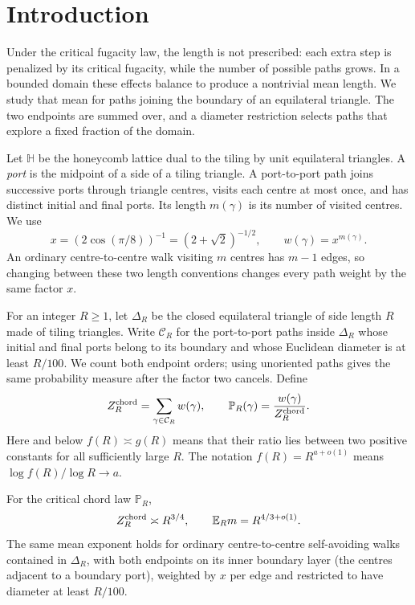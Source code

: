 \section{Introduction}
\label{sec:introduction}

Under the critical fugacity law, the length is not prescribed: each extra step is penalized by its critical fugacity, while the number of possible paths grows. In a bounded domain these effects balance to produce a nontrivial mean length. We study that mean for paths joining the boundary of an equilateral triangle. The two endpoints are summed over, and a diameter restriction selects paths that explore a fixed fraction of the domain.

Let $\mathbb H$ be the honeycomb lattice dual to the tiling by unit equilateral triangles. A \emph{port} is the midpoint of a side of a tiling triangle. A port-to-port path joins successive ports through triangle centres, visits each centre at most once, and has distinct initial and final ports. Its length $m(\gamma)$ is its number of visited centres. We use
\[
 x=(2\cos(\pi/8))^{-1}=(2+\sqrt2)^{-1/2},
 \qquad w(\gamma)=x^{m(\gamma)}.
\]
An ordinary centre-to-centre walk visiting $m$ centres has $m-1$ edges, so changing between these two length conventions changes every path weight by the same factor $x$.

For an integer $R\ge1$, let $\Delta_R$ be the closed equilateral triangle of side length $R$ made of tiling triangles. Write $\mathcal C_R$ for the port-to-port paths inside $\Delta_R$ whose initial and final ports belong to its boundary and whose Euclidean diameter is at least $R/100$. We count both endpoint orders; using unoriented paths gives the same probability measure after the factor two cancels. Define
\[
 Z_R^{\rm chord}=\sum_{\gamma\in\mathcal C_R}w(\gamma),
 \qquad
 \mathbb P_R(\gamma)=\frac{w(\gamma)}{Z_R^{\rm chord}}.
\]
Here and below $f(R)\asymp g(R)$ means that their ratio lies between two positive constants for all sufficiently large $R$. The notation $f(R)=R^{a+o(1)}$ means $\log f(R)/\log R\to a$.

\begin{theorem}\label{thm:triangle}
For the critical chord law $\mathbb P_R$,
\[
 Z_R^{\rm chord}\asymp R^{3/4},
 \qquad
 \mathbb E_R m=R^{4/3+o(1)}.
\]
The same mean exponent holds for ordinary centre-to-centre self-avoiding walks contained in $\Delta_R$, with both endpoints on its inner boundary layer (the centres adjacent to a boundary port), weighted by $x$ per edge and restricted to have diameter at least $R/100$.
\end{theorem}

